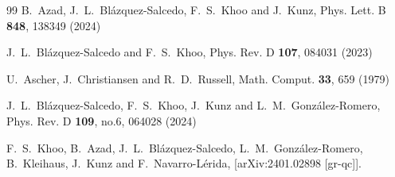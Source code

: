 \documentclass[aps,prd,12pt,superscriptaddress]{revtex4-2}
\begin{document}
\begin{thebibliography}{99}
B.~Azad, J.~L.~Bl\'azquez-Salcedo, F.~S.~Khoo and J.~Kunz,
Phys. Lett. B \textbf{848}, 138349 (2024)

J.~L.~Bl\'azquez-Salcedo and F.~S.~Khoo,
Phys. Rev. D \textbf{107}, 084031 (2023)

U.~Ascher, J.~Christiansen and R.~D.~Russell,
Math. Comput. \textbf{33}, 659 (1979)


J.~L.~Bl\'azquez-Salcedo, F.~S.~Khoo, J.~Kunz and L.~M.~Gonz\'alez-Romero,
Phys. Rev. D \textbf{109}, no.6, 064028 (2024)

F.~S.~Khoo, B.~Azad, J.~L.~Bl\'azquez-Salcedo, L.~M.~Gonz\'alez-Romero, B.~Kleihaus, J.~Kunz and F.~Navarro-L\'erida,
[arXiv:2401.02898 [gr-qc]].

\end{thebibliography}
\end{document}
